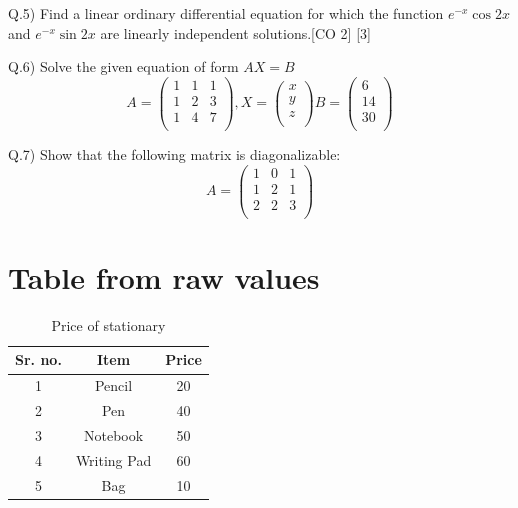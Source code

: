 \documentclass[12pt]{article}
\begin{document}
	\begin{flushleft}
		Q.5) Find a linear ordinary differential equation for which the function $e^{-x}\cos{2x}$ and $e^{-x}\sin{2x}$ are linearly independent solutions.\hspace{0.7cm}[CO 2] [3]
	\end{flushleft}
	\begin{flushleft}
		Q.6) Solve the given equation of form $AX=B$
		\[
		A=
		\begin{pmatrix}
			1 & 1 & 1 \\
			1 & 2 & 3 \\
			1 & 4 & 7 \\
		\end{pmatrix}
		,
		X=
		\begin{pmatrix}
			x \\
			y \\
			z \\
		\end{pmatrix}
		B=
		\begin{pmatrix}
			6  \\
			14 \\
			30 \\
		\end{pmatrix}
		\]
	\end{flushleft}
	\begin{flushleft}
		Q.7) Show that the following matrix is diagonalizable:
		\[
		A=
		\begin{pmatrix}
			1 & 0 & 1 \\
			1 & 2 & 1 \\
			2 & 2 & 3 \\
		\end{pmatrix}
		\]
	\end{flushleft}
	
	
	
	\newpage				
	
	\begin{table}
		\section{Table from raw values}
		\begin{center}
			\caption{Price of stationary}
			\begin{tabular}{||c |c |c ||} 
				\textbf{Sr. no.} & 
				\textbf{Item} &
				\textbf{Price}\\
				
				\hline
				1 & Pencil     & 20 \\
				2 & Pen    & 40 \\
				3 & Notebook     & 50 \\
				4 & Writing Pad    & 60 \\
				5 & Bag & 10 \\
			\end{tabular}
		\end{center}
	\end{table}		
\end{document}
